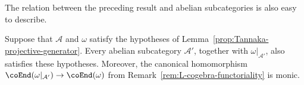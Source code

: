
The relation between the preceding result and abelian subcategories is also
easy to describe.

\begin{lemma}\label{prop:subcat-gen-L}
	Suppose that $\mathcal{A}$ and $\omega$ satisfy the hypotheses of
	Lemma~\ref{prop:Tannaka-projective-generator}. Every abelian subcategory
	$\mathcal{A}'$, together with $\omega|_{\mathcal{A}'}$, also satisfies
	these hypotheses. Moreover, the canonical homomorphism
	$\coEnd(\omega|_{\mathcal{A}'})\to\coEnd(\omega)$ from
	Remark~\ref{rem:L-cogebra-functoriality} is monic.
\end{lemma}

